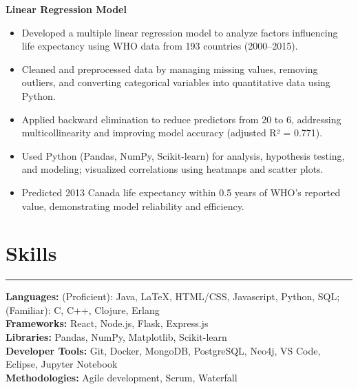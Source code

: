 \documentclass[10pt]{article}
\begin{document}
\textbf{Linear Regression Model} 
\vspace{-4mm}
\begin{itemize}[left=0.15in, itemsep=0pt, label=--]
    \item Developed a multiple linear regression model to analyze factors influencing life expectancy using WHO data from 193 countries (2000–2015).
    \item Cleaned and preprocessed data by managing missing values, removing outliers, and converting categorical variables into quantitative data using Python.
    \item Applied backward elimination to reduce predictors from 20 to 6, addressing multicollinearity and improving model accuracy (adjusted R² = 0.771).
    \item Used Python (Pandas, NumPy, Scikit-learn) for analysis, hypothesis testing, and modeling; visualized correlations using heatmaps and scatter plots.
    \item Predicted 2013 Canada life expectancy within 0.5 years of WHO’s reported value, demonstrating model reliability and efficiency.
\end{itemize}

\section*{Skills}
\vspace{-2mm}
\hrule
\vspace{0mm}
\textbf{Languages:} (Proficient): Java, LaTeX, HTML/CSS, Javascript, Python, SQL; (Familiar): C, C++, Clojure, Erlang \\
\textbf{Frameworks:} React, Node.js, Flask, Express.js  \\
\textbf{Libraries:} Pandas, NumPy, Matplotlib, Scikit-learn \\
\textbf{Developer Tools:} Git, Docker, MongoDB, PostgreSQL, Neo4j, VS Code, Eclipse, Jupyter Notebook \\
\textbf{Methodologies:} Agile development, Scrum, Waterfall
\end{document}
